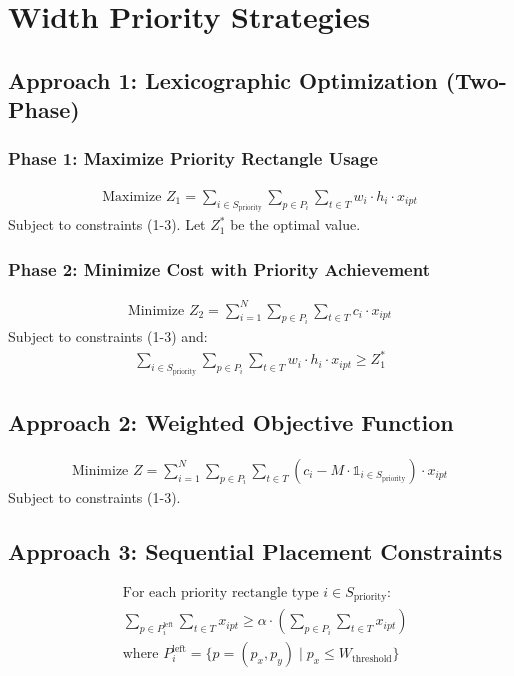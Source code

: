 \documentclass{article}
\begin{document}
\section{Width Priority Strategies}

\subsection{Approach 1: Lexicographic Optimization (Two-Phase)}

\subsubsection{Phase 1: Maximize Priority Rectangle Usage}
\begin{align*}
\text{Maximize } Z_1 = \sum_{i \in S_{\text{priority}}} \sum_{p \in P_i} \sum_{t \in T} w_i \cdot h_i \cdot x_{ipt}
\end{align*}
Subject to constraints (1-3). Let $Z_1^*$ be the optimal value.

\subsubsection{Phase 2: Minimize Cost with Priority Achievement}
\begin{align*}
\text{Minimize } Z_2 = \sum_{i=1}^{N} \sum_{p \in P_i} \sum_{t \in T} c_i \cdot x_{ipt}
\end{align*}
Subject to constraints (1-3) and:
\begin{align}
\sum_{i \in S_{\text{priority}}} \sum_{p \in P_i} \sum_{t \in T} w_i \cdot h_i \cdot x_{ipt} \geq Z_1^*
\end{align}

\subsection{Approach 2: Weighted Objective Function}
\begin{align*}
\text{Minimize } Z = \sum_{i=1}^{N} \sum_{p \in P_i} \sum_{t \in T} \left(c_i - M \cdot \mathbb{1}_{i \in S_{\text{priority}}}\right) \cdot x_{ipt}
\end{align*}
Subject to constraints (1-3).

\subsection{Approach 3: Sequential Placement Constraints}
\begin{align*}
&\text{For each priority rectangle type } i \in S_{\text{priority}}: \\
&\sum_{p \in P_i^{\text{left}}} \sum_{t \in T} x_{ipt} \geq \alpha \cdot \left(\sum_{p \in P_i} \sum_{t \in T} x_{ipt}\right) \\
&\text{where } P_i^{\text{left}} = \{p = (p_x, p_y) \mid p_x \leq W_{\text{threshold}}\}
\end{align*}
\end{document}
